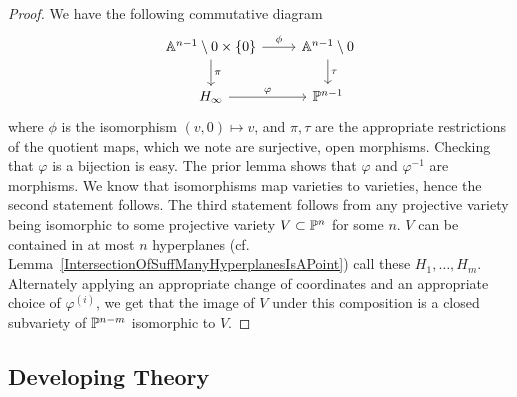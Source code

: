     \begin{proof}
        We have the following commutative diagram 
        $$
            \begin{tikzcd}
                \A^{n-1}\setminus 0 \times \{0\} \arrow[r, "\phi"] \arrow[d, "\pi"] & \A^{n-1}\setminus 0\arrow[d, "\tau"] \\
                H_\infty \arrow[r,"\varphi"] & \Pp^{n-1}
            \end{tikzcd}
        $$
        where $\phi$ is the isomorphism $(v,0)\mapsto v$, and $\pi,\tau$ are the appropriate restrictions of the quotient maps, which we note are surjective, open morphisms. Checking that $\varphi$ is a bijection is easy. The prior lemma shows that $\varphi$ and $\varphi^{-1}$ are morphisms. We know that isomorphisms map varieties to varieties, hence the second statement follows. The third statement follows from any projective variety being isomorphic to some projective variety $V\subset\mathbb{P}^n$ for some $n$. $V$ can be contained in at most $n$ hyperplanes (cf. Lemma~\ref{IntersectionOfSuffManyHyperplanesIsAPoint}) call these $H_1,\dots,H_m$. Alternately applying an appropriate change of coordinates and an appropriate choice of $\varphi^{(i)}$, we get that the image of $V$ under this composition is a closed subvariety of $\mathbb{P}^{n-m}$ isomorphic to $V$.
    \end{proof}
    \subsection{Developing Theory}
